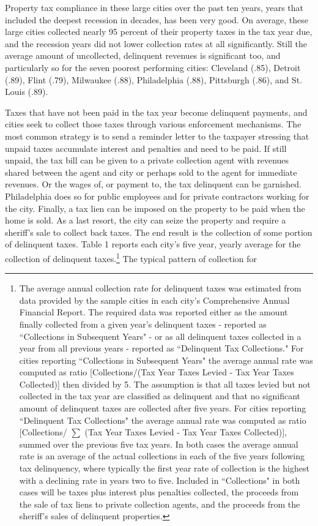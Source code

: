 \documentclass[12pt,titlepage]{article}
\begin{document}
Property tax compliance in these large cities over the past ten years,
years that included the deepest recession in decades, has been very
good.  On average, these large cities collected nearly 95 percent of
their property taxes in the tax year due, and the recession years did
not lower collection rates at all significantly.  Still the average
amount of uncollected, delinquent revenues is significant too, and
particularly so for the seven poorest performing cities: Cleveland
(.85), Detroit (.89), Flint (.79), Milwaukee (.88), Philadelphia
(.88), Pittsburgh (.86), and St. Louis (.89).

Taxes that have not been paid in the tax year become delinquent
payments, and cities seek to collect those taxes through various
enforcement mechanisms.  The most common strategy is to send a
reminder letter to the taxpayer stressing that unpaid taxes accumulate
interest and penalties and need to be paid.  If still unpaid, the tax
bill can be given to a private collection agent with revenues shared
between the agent and city or perhaps sold to the agent for immediate
revenues.  Or the wages of, or payment to, the tax delinquent can be
garnished.  Philadelphia does so for public employees and for private
contractors working for the city.  Finally, a tax lien can be imposed
on the property to be paid when the home is sold.  As a last resort,
the city can seize the property and require a sheriff's sale to
collect back taxes.  The end result is the collection of some portion
of delinquent taxes.  Table 1 reports each city's five year, yearly
average for the collection of delinquent taxes.\footnote{The average
  annual collection rate for delinquent taxes was estimated from data
  provided by the sample cities in each city's Comprehensive Annual
  Financial Report.  The required data was reported either as the
  amount finally collected from a given year's delinquent taxes -
  reported as ``Collections in Subsequent Years" - or as all
  delinquent taxes collected in a year from all previous years -
  reported as ``Delinquent Tax Collections."  For cities reporting
  ``Collections in Subsequent Years" the average annual rate was
  computed as ratio [Collections/(Tax Year Taxes Levied - Tax Year
    Taxes Collected)] then divided by 5.  The assumption is that all
  taxes levied but not collected in the tax year are classified as
  delinquent and that no significant amount of delinquent taxes are
  collected after five years.  For cities reporting ``Delinquent Tax
  Collections" the average annual rate was computed as ratio
  [Collections/ $\sum$ (Tax Year Taxes Levied - Tax Year Taxes
    Collected)], summed over the previous five tax years.  In both
  cases the average annual rate is an average of the actual
  collections in each of the five years following tax delinquency,
  where typically the first year rate of collection is the highest
  with a declining rate in years two to five.  Included in
  ``Collections" in both cases will be taxes plus interest plus
  penalties collected, the proceeds from the sale of tax liens to
  private collection agents, and the proceeds from the sheriff's sales
  of delinquent properties.} The typical pattern of collection for
\end{document}
